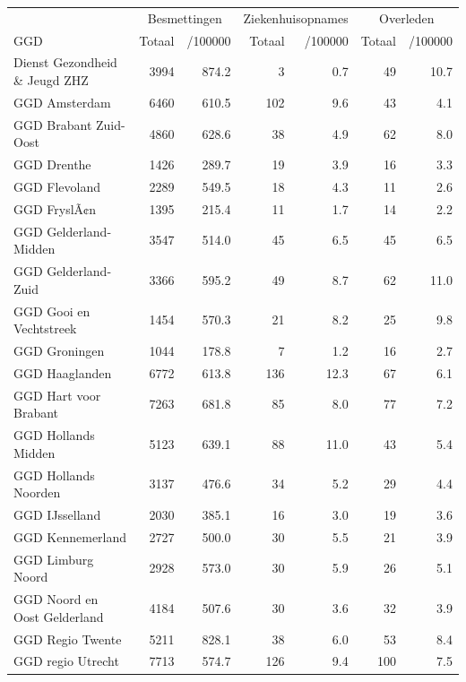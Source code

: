 \documentclass[
  english,
  man,floatsintext]{apa6}
\begin{document}
\begin{table}[H]
\centering\begingroup\fontsize{10}{12}\selectfont

\begin{threeparttable}
\begin{tabular}{lrrrrrr}
\toprule
\multicolumn{1}{c}{ } & \multicolumn{2}{c}{Besmettingen} & \multicolumn{2}{c}{Ziekenhuisopnames} & \multicolumn{2}{c}{Overleden} \\
\cmidrule(l{3pt}r{3pt}){2-3} \cmidrule(l{3pt}r{3pt}){4-5} \cmidrule(l{3pt}r{3pt}){6-7}
GGD & Totaal & /100000 & Totaal & /100000 & Totaal & /100000\\
\midrule
Dienst Gezondheid \& Jeugd ZHZ & 3994 & 874.2 & 3 & 0.7 & 49 & 10.7\\
GGD Amsterdam & 6460 & 610.5 & 102 & 9.6 & 43 & 4.1\\
GGD Brabant Zuid-Oost & 4860 & 628.6 & 38 & 4.9 & 62 & 8.0\\
GGD Drenthe & 1426 & 289.7 & 19 & 3.9 & 16 & 3.3\\
GGD Flevoland & 2289 & 549.5 & 18 & 4.3 & 11 & 2.6\\
GGD FryslÃ¢n & 1395 & 215.4 & 11 & 1.7 & 14 & 2.2\\
GGD Gelderland-Midden & 3547 & 514.0 & 45 & 6.5 & 45 & 6.5\\
GGD Gelderland-Zuid & 3366 & 595.2 & 49 & 8.7 & 62 & 11.0\\
GGD Gooi en Vechtstreek & 1454 & 570.3 & 21 & 8.2 & 25 & 9.8\\
GGD Groningen & 1044 & 178.8 & 7 & 1.2 & 16 & 2.7\\
GGD Haaglanden & 6772 & 613.8 & 136 & 12.3 & 67 & 6.1\\
GGD Hart voor Brabant & 7263 & 681.8 & 85 & 8.0 & 77 & 7.2\\
GGD Hollands Midden & 5123 & 639.1 & 88 & 11.0 & 43 & 5.4\\
GGD Hollands Noorden & 3137 & 476.6 & 34 & 5.2 & 29 & 4.4\\
GGD IJsselland & 2030 & 385.1 & 16 & 3.0 & 19 & 3.6\\
GGD Kennemerland & 2727 & 500.0 & 30 & 5.5 & 21 & 3.9\\
GGD Limburg Noord & 2928 & 573.0 & 30 & 5.9 & 26 & 5.1\\
GGD Noord en Oost Gelderland & 4184 & 507.6 & 30 & 3.6 & 32 & 3.9\\
GGD Regio Twente & 5211 & 828.1 & 38 & 6.0 & 53 & 8.4\\
GGD regio Utrecht & 7713 & 574.7 & 126 & 9.4 & 100 & 7.5\\

\end{tabular}
\end{threeparttable}
\end{table}
\end{document}
